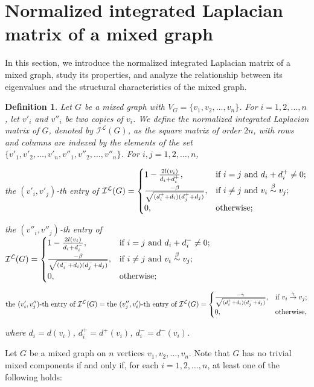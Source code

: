 \documentclass[12pt]{article}
\numberwithin{equation}{section}
\newtheorem{defn}{Definition}[section]
\begin{document}
	\section{Normalized integrated Laplacian matrix of a mixed graph}\label{S6}
In this section, we introduce the normalized integrated Laplacian matrix of a mixed graph, study its properties, and analyze the relationship between its eigenvalues and the structural characteristics of the mixed graph.
	\begin{defn}\normalfont
		Let $G$ be a mixed graph with $V_G=\{v_1,v_2,\ldots,v_n\}$. For $i=1,2,\ldots,n$, let $v'_i$ and $v''_i$ be two copies of $v_i$. We define the \textit{normalized integrated Laplacian matrix} of $G$, denoted by $\mathcal{I}^\mathcal{L}(G)$, as the square matrix of order $2n$, with rows and columns are indexed by the elements of the set $\{v'_1,v'_2,\ldots,v'_n,v''_1,v''_2,\ldots,v''_n\}$.
		For $i,j=1,2,\ldots,n$,
		
		the $(v'_i,v'_j)$-th entry of $\mathcal{I}^\mathcal{L}(G)=\begin{cases}
			1-\frac{2l(v_i)}{d_i+d^+_i}, & \text{if~} i=j \text{~and~} d_i+d^{+}_i\neq 0;\\
			\frac{-\beta}{\sqrt{(d^{+}_{i}+d_{i})(d^{+}_{j}+d_{j})}}, & \text{if}~i\neq j\textnormal{ and}~ v_{i}\overset{\beta}{\sim} v_{j};\\
			0, & \text{otherwise};
		\end{cases}$
		
		the $(v''_i,v''_j)$-th entry of $\mathcal{I}^\mathcal{L}(G)=\begin{cases}
			1-\frac{2l(v_i)}{d_i+d^-_i}, & \text{if~} i=j \text{~and~} d_i+d^{-}_i\neq 0;\\
			\frac{-\beta}{\sqrt{(d^{-}_{i}+d_{i})(d^{-}_{j}+d_{j})}}, & \text{if}~i\neq j\textnormal{ and}~ v_{i}\overset{\beta}{\sim} v_{j};\\
			0, & \text{otherwise};
		\end{cases}$
		
		$$\text{the }(v'_i,v''_j)\text{-th entry of } \mathcal{I}^\mathcal{L}(G)=\textnormal{the }(v''_j,v'_i)\text{-th entry of }\mathcal{I}^\mathcal{L}(G)=\begin{cases}
			\frac{-\gamma}{\sqrt{(d^{+}_{i}+d_{i})(d^{-}_{j}+d_{j})}}, & \text{if}~ v_{i}\overset{\gamma}{\rightarrow} v_{j};\\
			0, & \text{otherwise},
		\end{cases}$$
		
		\noindent where $d_i=d(v_i)$, $d^+_i=d^+(v_i)$, $d^-_i=d^-(v_i)$.
	\end{defn}
	Let $G$ be a mixed graph on $n$ vertices $v_1,v_2,\ldots,v_n$. Note that $G$ has no trivial mixed components if and only if, for each $i=1,2,\ldots,n$, at least one of the following holds:
	
\end{document}
